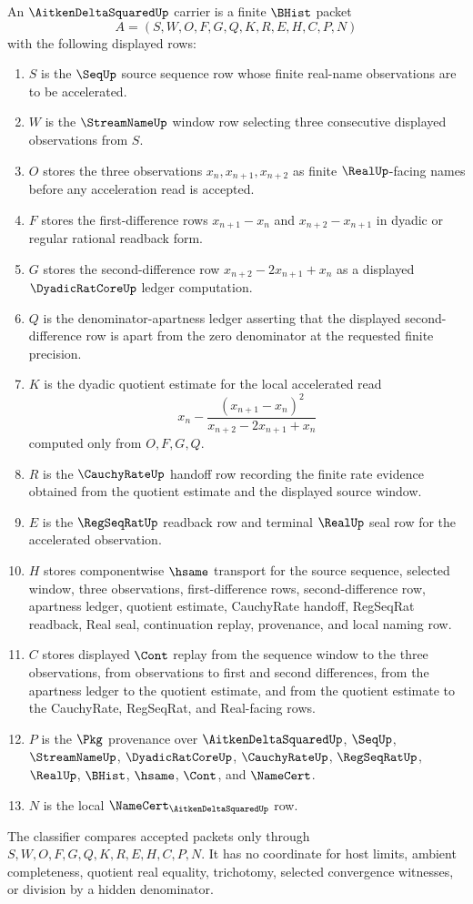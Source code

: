 \begin{definition}
\label{def:aitken-delta-squared-carrier}
An $\AitkenDeltaSquaredUp$ carrier is a finite $\BHist$ packet
$$
A=(S,W,O,F,G,Q,K,R,E,H,C,P,N)
$$
with the following displayed rows:
\begin{enumerate}
\item $S$ is the $\SeqUp$ source sequence row whose finite real-name observations are to be accelerated.
\item $W$ is the $\StreamNameUp$ window row selecting three consecutive displayed observations from $S$.
\item $O$ stores the three observations $x_n,x_{n+1},x_{n+2}$ as finite $\RealUp$-facing names before any acceleration read is accepted.
\item $F$ stores the first-difference rows $x_{n+1}-x_n$ and $x_{n+2}-x_{n+1}$ in dyadic or regular rational readback form.
\item $G$ stores the second-difference row $x_{n+2}-2x_{n+1}+x_n$ as a displayed $\DyadicRatCoreUp$ ledger computation.
\item $Q$ is the denominator-apartness ledger asserting that the displayed second-difference row is apart from the zero denominator at the requested finite precision.
\item $K$ is the dyadic quotient estimate for the local accelerated read
$$
x_n-\frac{(x_{n+1}-x_n)^2}{x_{n+2}-2x_{n+1}+x_n}
$$
computed only from $O,F,G,Q$.
\item $R$ is the $\CauchyRateUp$ handoff row recording the finite rate evidence obtained from the quotient estimate and the displayed source window.
\item $E$ is the $\RegSeqRatUp$ readback row and terminal $\RealUp$ seal row for the accelerated observation.
\item $H$ stores componentwise $\hsame$ transport for the source sequence, selected window, three observations, first-difference rows, second-difference row, apartness ledger, quotient estimate, CauchyRate handoff, RegSeqRat readback, Real seal, continuation replay, provenance, and local naming row.
\item $C$ stores displayed $\Cont$ replay from the sequence window to the three observations, from observations to first and second differences, from the apartness ledger to the quotient estimate, and from the quotient estimate to the CauchyRate, RegSeqRat, and Real-facing rows.
\item $P$ is the $\Pkg$ provenance over $\AitkenDeltaSquaredUp$, $\SeqUp$, $\StreamNameUp$, $\DyadicRatCoreUp$, $\CauchyRateUp$, $\RegSeqRatUp$, $\RealUp$, $\BHist$, $\hsame$, $\Cont$, and $\NameCert$.
\item $N$ is the local $\NameCert_{\AitkenDeltaSquaredUp}$ row.
\end{enumerate}
The classifier compares accepted packets only through $S,W,O,F,G,Q,K,R,E,H,C,P,N$. It has no coordinate for host limits, ambient completeness, quotient real equality, trichotomy, selected convergence witnesses, or division by a hidden denominator.
\end{definition}


